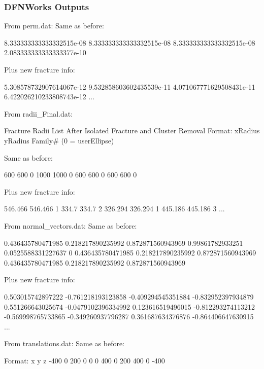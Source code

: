 \documentclass{beamer}
\newcommand\bluecomment[1]{{{\color{blue} #1}}}
\begin{document}
\begin{frame} \frametitle{DFNWorks Outputs}
	From perm.dat:
	\bluecomment{Same as before:}
	\begin{semiverbatim}
		8.333333333333332515e-08
		8.333333333333332515e-08
		8.333333333333332515e-08
		2.083333333333333377e-10
	\end{semiverbatim}
	\bluecomment{Plus new fracture info:}
	\begin{semiverbatim}
		5.308578732907614067e-12
		9.532858603602435539e-11
		4.071067771629508431e-11
		6.422026210233808743e-12
		...
		
		
		
	\end{semiverbatim}
	From radii\_Final.dat:
	
	\begin{semiverbatim}
		Fracture Radii List After Isolated Fracture 
		   and Cluster Removal
		Format: xRadius yRadius Family# (0 = userEllipse)
	\end{semiverbatim}
	\bluecomment{Same as before:}
	\begin{semiverbatim}
		600 600 0
		1000 1000 0
		600 600 0
		600 600 0
		
		
		
		
		
		
	\end{semiverbatim}
	\bluecomment{Plus new fracture info:}
	\begin{semiverbatim}
		546.466 546.466 1
		334.7 334.7 2
		326.294 326.294 1
		445.186 445.186 3
		...
	\end{semiverbatim}

	From normal\_vectors.dat:
	\newline
	\bluecomment{Same as before:}
	\begin{semiverbatim}
		0.436435780471985 0.218217890235992 0.872871560943969
		0.99861782933251 0.0525588331227637 0
		0.436435780471985 0.218217890235992 0.872871560943969
		0.436435780471985 0.218217890235992 0.872871560943969
		
		
		
	\end{semiverbatim}
	\bluecomment{Plus new fracture info:}
	\begin{semiverbatim}
		0.503015742897222 -0.761218193123858 -0.409294545351884
		-0.832952397934879 0.551266643025674 -0.0479102396334992
		0.123616519496015 -0.812293274113212 -0.569998765733865
		-0.349260937796287 0.361687634376876 -0.864406647630915
		...
	\end{semiverbatim}
	From translations.dat:
	\newline
	\bluecomment{Same as before:}
	\begin{semiverbatim}
		Format: x y z 
		-400 0 200
		0 0 0
		400 0 200
		400 0 -400
		

\end{semiverbatim}
\end{frame}
\end{document}
